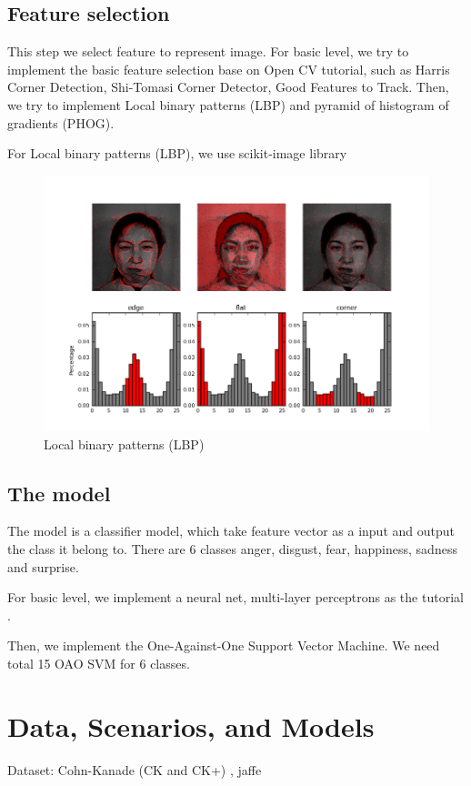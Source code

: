 \documentclass[a4paper, 12pt]{article}
\begin{document}
\subsection{Feature selection}
	This step we select feature to represent image. 
	For basic level, we try to implement the basic feature selection base on Open CV tutorial, such as Harris Corner Detection, Shi-Tomasi Corner Detector, Good Features to Track. 
	Then, we try to implement Local binary patterns (LBP) and pyramid of histogram of gradients (PHOG). 
	
	For Local binary patterns (LBP), we use scikit-image library \cite{van2014scikit}

\begin{figure}[H]
	\centering
	\includegraphics[width=1\linewidth]{./figure/scikit_image_lbp.png}
	\caption[]{Local binary patterns (LBP)}
	\label{fig:lbp}
	\end{figure}
		
\subsection{The model}
	The model is a classifier model, which take feature vector as a input and output the class it belong to. There are 6 classes anger, disgust, fear, happiness, sadness and surprise.
	
	For basic level, we implement a neural net, multi-layer perceptrons as the tutorial \cite{mlp}.
	
	Then, we implement the One-Against-One Support Vector Machine. We need total 15 OAO SVM for 6 classes.
	

\section{Data, Scenarios, and Models}
Dataset: Cohn-Kanade (CK and CK+) \cite{5543262}, jaffe \cite{lyons1998japanese}





\end{document}
